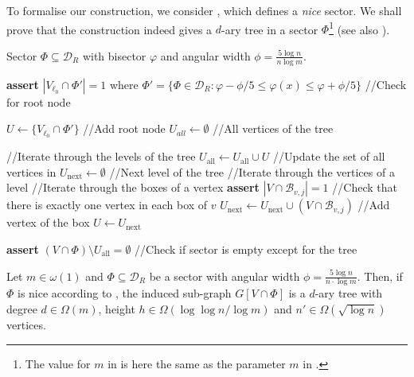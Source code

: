 \documentclass[letterpaper,11pt]{article}
\newcommand{\disk}{\ensuremath{\mathcal D_R}\xspace}
\newcommand{\1}{\mathbb I}
\newcommand{\boxbelow}[2]{\mathcal{B}_{#1, #2}}
\begin{document}
To formalise our construction, we consider , which defines a \emph{nice} sector. We shall prove that the construction indeed gives a $d$-ary tree in a sector $\Phi$\footnote{The value for $m$ in  is here the same as the parameter $m$ in .} (see also ).
%
\begin{algorithm}
\caption{Nice sector $\Phi$}
\begin{algorithmic}[1]\label{alg:nice-sector}

\Require Sector $\Phi \subseteq \mathcal{D}_R$ with bisector $\varphi$ and angular width $\phi = \frac{5 \log n}{n\log m}$.

\State \textbf{assert} $|V_{\ell_0} \cap \Phi'| = 1$ where $\Phi' = \{\Phi \in \disk : \varphi - \phi/5 \leq \varphi(x) \leq \varphi +  \phi/5\} $ //Check for root node

\State $U \gets \{V_{\ell_0} \cap \Phi'\}$ //Add root node
\State $U_{all} \gets \emptyset$ //All vertices of the tree

 //Iterate through the levels of the tree
\State $U_{\text{all}} \gets U_{\text{all}} \cup U$ //Update the set of all vertices in
    \State $U_{\text{next}} \gets \emptyset$ //Next level of the tree
     //Iterate through the vertices of a level
         //Iterate through the boxes of a vertex
        \State \textbf{assert} $|V \cap \boxbelow{v}{j}| = 1$ //Check that there is exactly one vertex in each box of $v$
            \State $U_{\text{next}} \gets U_{\text{next}} \cup (V \cap \boxbelow{v}{j})$ //Add vertex of the box
        \EndFor
    \EndFor
    \State $U \gets U_{\text{next}}$
\EndFor

\State \textbf{assert} $(V \cap \Phi) \setminus U_{\text{all}} = \emptyset$ //Check if sector is empty except for the tree

\end{algorithmic}
\end{algorithm}
%
\begin{lemma}\label{lem:tree-geometry}
    Let $m \in \omega(1)$ and $\Phi \subseteq \mathcal{D}_R$ be a sector with angular width $\phi = \frac{5 \log n}{n\cdot \log m}$. Then, if $\Phi$ is nice according to , the induced sub-graph $G[V \cap \Phi]$ is a $d$-ary tree with degree $d \in \Omega(m)$, height $h \in \Omega(\log\log n/ \log m)$ and $n' \in \Omega(\sqrt{\log n})$ vertices.
\end{lemma}
\end{document}
